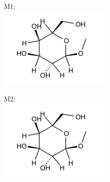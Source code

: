 \documentclass[10pt]{article}
\begin{document}
M1:\\
\includegraphics{smile-64bfddfaeb0c444e8179bb389e2f6fe9d4ab6373}

M2:\\
\includegraphics{smile-6192c6a20608b6969c02c99c33650295b6e878be}
\end{document}
